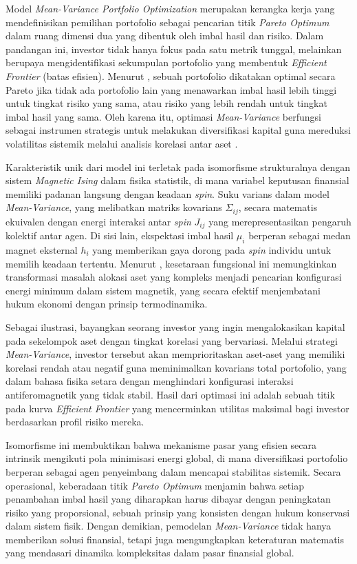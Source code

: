 Model \textit{Mean-Variance Portfolio Optimization} merupakan kerangka kerja yang mendefinisikan pemilihan portofolio sebagai pencarian titik \textit{Pareto Optimum} dalam ruang dimensi dua yang dibentuk oleh imbal hasil dan risiko. Dalam pandangan ini, investor tidak hanya fokus pada satu metrik tunggal, melainkan berupaya mengidentifikasi sekumpulan portofolio yang membentuk \textit{Efficient Frontier} (batas efisien). Menurut \cite{markowitz_portfolio_1952}, sebuah portofolio dikatakan optimal secara Pareto jika tidak ada portofolio lain yang menawarkan imbal hasil lebih tinggi untuk tingkat risiko yang sama, atau risiko yang lebih rendah untuk tingkat imbal hasil yang sama. Oleh karena itu, optimasi \textit{Mean-Variance} berfungsi sebagai instrumen strategis untuk melakukan diversifikasi kapital guna mereduksi volatilitas sistemik melalui analisis korelasi antar aset \cite{onnela_dynamics_2003}.

Karakteristik unik dari model ini terletak pada isomorfisme strukturalnya dengan sistem \textit{Magnetic Ising} dalam fisika statistik, di mana variabel keputusan finansial memiliki padanan langsung dengan keadaan \textit{spin}. Suku varians dalam model \textit{Mean-Variance}, yang melibatkan matriks kovarians $\Sigma_{ij}$, secara matematis ekuivalen dengan energi interaksi antar \textit{spin} $J_{ij}$ yang merepresentasikan pengaruh kolektif antar agen. Di sisi lain, ekspektasi imbal hasil $\mu_i$ berperan sebagai medan magnet eksternal $h_i$ yang memberikan gaya dorong pada \textit{spin} individu untuk memilih keadaan tertentu. Menurut \cite{lucas_ising_2014}, kesetaraan fungsional ini memungkinkan transformasi masalah alokasi aset yang kompleks menjadi pencarian konfigurasi energi minimum dalam sistem magnetik, yang secara efektif menjembatani hukum ekonomi dengan prinsip termodinamika.

\begin{example}
    Sebagai ilustrasi, bayangkan seorang investor yang ingin mengalokasikan kapital pada sekelompok aset dengan tingkat korelasi yang bervariasi. Melalui strategi \textit{Mean-Variance}, investor tersebut akan memprioritaskan aset-aset yang memiliki korelasi rendah atau negatif guna meminimalkan kovarians total portofolio, yang dalam bahasa fisika setara dengan menghindari konfigurasi interaksi antiferomagnetik yang tidak stabil. Hasil dari optimasi ini adalah sebuah titik pada kurva \textit{Efficient Frontier} yang mencerminkan utilitas maksimal bagi investor berdasarkan profil risiko mereka. 
    
    Isomorfisme ini membuktikan bahwa mekanisme pasar yang efisien secara intrinsik mengikuti pola minimisasi energi global, di mana diversifikasi portofolio berperan sebagai agen penyeimbang dalam mencapai stabilitas sistemik. Secara operasional, keberadaan titik \textit{Pareto Optimum} menjamin bahwa setiap penambahan imbal hasil yang diharapkan harus dibayar dengan peningkatan risiko yang proporsional, sebuah prinsip yang konsisten dengan hukum konservasi dalam sistem fisik. Dengan demikian, pemodelan \textit{Mean-Variance} tidak hanya memberikan solusi finansial, tetapi juga mengungkapkan keteraturan matematis yang mendasari dinamika kompleksitas dalam pasar finansial global.
\end{example}

